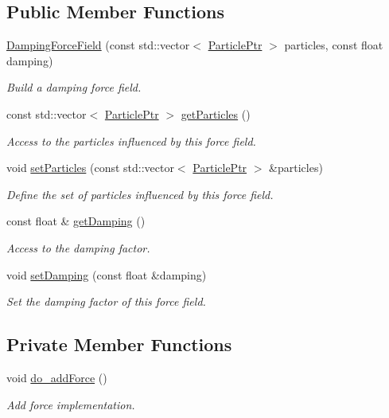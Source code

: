 \subsection*{Public Member Functions}
\begin{DoxyCompactItemize}
\item 
\hyperlink{classDampingForceField_ac12609d97690d02099acf10710d2bf3f}{Damping\+Force\+Field} (const std\+::vector$<$ \hyperlink{Particle_8hpp_a9a7abc8635002993537b61ef2c857fdd}{Particle\+Ptr} $>$ particles, const float damping)
\begin{DoxyCompactList}\small\item\em Build a damping force field. \end{DoxyCompactList}\item 
const std\+::vector$<$ \hyperlink{Particle_8hpp_a9a7abc8635002993537b61ef2c857fdd}{Particle\+Ptr} $>$ \hyperlink{classDampingForceField_ace8b8327d3dfd2d6cc58808e301c4542}{get\+Particles} ()
\begin{DoxyCompactList}\small\item\em Access to the particles influenced by this force field. \end{DoxyCompactList}\item 
void \hyperlink{classDampingForceField_a98de1771d2113b73112b602159bf7117}{set\+Particles} (const std\+::vector$<$ \hyperlink{Particle_8hpp_a9a7abc8635002993537b61ef2c857fdd}{Particle\+Ptr} $>$ \&particles)
\begin{DoxyCompactList}\small\item\em Define the set of particles influenced by this force field. \end{DoxyCompactList}\item 
const float \& \hyperlink{classDampingForceField_a02f7ce65355038fa8c29526d4c63d631}{get\+Damping} ()
\begin{DoxyCompactList}\small\item\em Access to the damping factor. \end{DoxyCompactList}\item 
void \hyperlink{classDampingForceField_ae4f282bc01a1b517f76fa7782a70ff6c}{set\+Damping} (const float \&damping)
\begin{DoxyCompactList}\small\item\em Set the damping factor of this force field. \end{DoxyCompactList}\end{DoxyCompactItemize}
\subsection*{Private Member Functions}
\begin{DoxyCompactItemize}
\item 
void \hyperlink{classDampingForceField_a5677c09b83f6f2d13e70e40c08c4e85f}{do\+\_\+add\+Force} ()
\begin{DoxyCompactList}\small\item\em Add force implementation. \end{DoxyCompactList}\end{DoxyCompactItemize}
